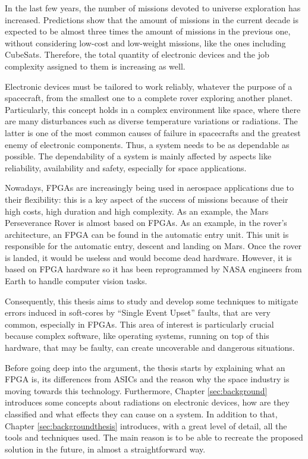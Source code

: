 In the last few years, the number of missions devoted to universe exploration has increased. Predictions show that the amount of missions in the current decade is expected to be almost three times the amount of missions in the previous one, without considering low-cost and low-weight missions, like the ones including CubeSats. Therefore, the total quantity of electronic devices and the job complexity assigned to them is increasing as well.\bigskip

Electronic devices must be tailored to work reliably, whatever the purpose of a spacecraft, from the smallest one to a complete rover exploring another planet. Particularly, this concept holds in a complex environment like space, where there are many disturbances such as diverse temperature variations or radiations. The latter is one of the most common causes of failure in spacecrafts and the greatest enemy of electronic components. Thus, a system needs to be as dependable as possible. The dependability of a system is mainly affected by aspects like reliability, availability and safety, especially for space applications.\bigskip

Nowadays, FPGAs are increasingly being used in aerospace applications due to their flexibility: this is a key aspect of the success of missions because of their high costs, high duration and high complexity. As an example, the Mars Perseverance Rover is almost based on FPGAs. As an example, in the rover's architecture, an FPGA can be found in the automatic entry unit. This unit is responsible for the automatic entry, descent and landing on Mars. Once the rover is landed, it would be useless and would become dead hardware. However, it is based on FPGA hardware so it has been reprogrammed by NASA engineers from Earth to handle computer vision tasks. \bigskip

Consequently, this thesis aims to study and develop some techniques to mitigate errors induced in soft-cores by “Single Event Upset” faults, that are very common, especially in FPGAs. This area of interest is particularly crucial because complex software, like operating systems, running on top of this hardware, that may be faulty, can create uncoverable and dangerous situations. \bigskip

Before going deep into the argument, the thesis starts by explaining what an FPGA is, its differences from ASICs and the reason why the space industry is moving towards this technology. Furthermore, Chapter \ref{sec:background} introduces some concepts about radiations on electronic devices, how are they classified and what effects they can cause on a system. In addition to that, Chapter \ref{sec:backgroundthesis} introduces, with a great level of detail, all the tools and techniques used. The main reason is to be able to recreate the proposed solution in the future, in almost a straightforward way. \bigskip

